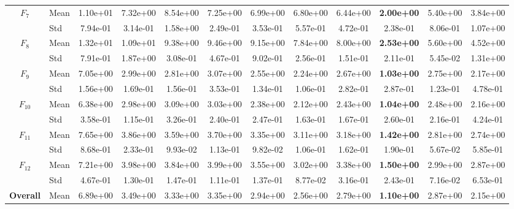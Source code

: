 \begin{center}
\begin{longtable}{clcccccccccc}
\midrule
$F_{7}$ & Mean & 1.10e+01 & 7.32e+00 & 8.54e+00 & 7.25e+00 & 6.99e+00 & 6.80e+00 & 6.44e+00 & \textbf{2.00e+00} & 5.40e+00 & 3.84e+00 \\
 & Std & 7.94e-01 & 3.14e-01 & 1.58e+00 & 2.49e-01 & 3.53e-01 & 5.57e-01 & 4.72e-01 & 2.38e-01 & 8.06e-01 & 1.07e+00 \\
\midrule
$F_{8}$ & Mean & 1.32e+01 & 1.09e+01 & 9.38e+00 & 9.46e+00 & 9.15e+00 & 7.84e+00 & 8.00e+00 & \textbf{2.53e+00} & 5.60e+00 & 4.52e+00 \\
 & Std & 7.91e-01 & 1.87e+00 & 3.08e-01 & 4.67e-01 & 9.02e-01 & 2.56e-01 & 1.51e-01 & 2.11e-01 & 5.45e-02 & 1.31e+00 \\
\midrule
$F_{9}$ & Mean & 7.05e+00 & 2.99e+00 & 2.81e+00 & 3.07e+00 & 2.55e+00 & 2.24e+00 & 2.67e+00 & \textbf{1.03e+00} & 2.75e+00 & 2.17e+00 \\
 & Std & 1.56e+00 & 1.69e-01 & 1.56e-01 & 3.53e-01 & 1.34e-01 & 1.06e-01 & 2.82e-01 & 2.87e-01 & 1.23e-01 & 4.78e-01 \\
\midrule
$F_{10}$ & Mean & 6.38e+00 & 2.98e+00 & 3.09e+00 & 3.03e+00 & 2.38e+00 & 2.12e+00 & 2.43e+00 & \textbf{1.04e+00} & 2.48e+00 & 2.16e+00 \\
 & Std & 3.58e-01 & 1.15e-01 & 3.26e-01 & 2.40e-01 & 2.47e-01 & 1.63e-01 & 1.67e-01 & 2.60e-01 & 2.16e-01 & 4.24e-01 \\
\midrule
$F_{11}$ & Mean & 7.65e+00 & 3.86e+00 & 3.59e+00 & 3.70e+00 & 3.35e+00 & 3.11e+00 & 3.18e+00 & \textbf{1.42e+00} & 2.81e+00 & 2.74e+00 \\
 & Std & 8.68e-01 & 2.33e-01 & 9.93e-02 & 1.13e-01 & 9.82e-02 & 1.06e-01 & 1.62e-01 & 1.90e-01 & 5.67e-02 & 5.85e-01 \\
\midrule
$F_{12}$ & Mean & 7.21e+00 & 3.98e+00 & 3.84e+00 & 3.99e+00 & 3.55e+00 & 3.02e+00 & 3.38e+00 & \textbf{1.50e+00} & 2.99e+00 & 2.87e+00 \\
 & Std & 4.67e-01 & 1.30e-01 & 1.47e-01 & 1.11e-01 & 1.37e-01 & 8.77e-02 & 3.16e-01 & 2.43e-01 & 7.16e-02 & 6.53e-01 \\
\midrule
\textbf{Overall} & Mean & 6.89e+00 & 3.49e+00 & 3.33e+00 & 3.35e+00 & 2.94e+00 & 2.56e+00 & 2.79e+00 & \textbf{1.10e+00} & 2.87e+00 & 2.15e+00 \\
\bottomrule
\end{longtable}
\end{center}